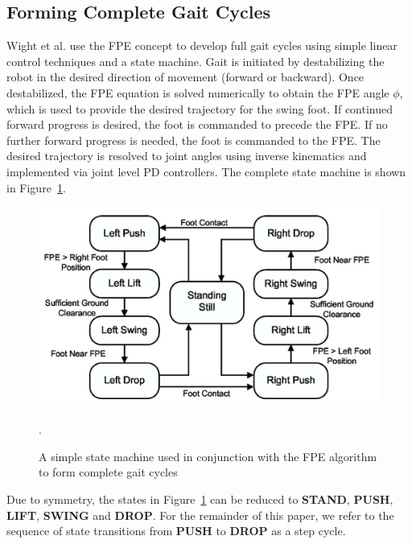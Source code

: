 \subsection{Forming Complete Gait Cycles} %
\label{sub:gait_cycles}
Wight et al. \cite{Wight:2008ii} use the FPE concept to develop full gait cycles using simple linear control techniques and a state machine. Gait is initiated by destabilizing the robot in the desired direction of movement (forward or backward). Once destabilized, the FPE equation is solved numerically to obtain the FPE angle $\phi$, which is used to provide the desired trajectory for the swing foot.  If continued forward progress is desired, the foot is commanded to precede the FPE. If no further forward progress is needed, the foot is commanded to the FPE. The desired trajectory is resolved to joint angles using inverse kinematics and implemented via joint level PD controllers. The complete state machine is shown in Figure~\ref{fig:statemachine}.

\begin{figure}[!h]
	\centering
    \includegraphics[scale=0.22]{fig/ch4/fpestatemachine.png}
  	\caption{A simple state machine used in conjunction with the FPE algorithm to form complete gait cycles}.
	\label{fig:statemachine}
\end{figure}

Due to symmetry, the states in Figure~\ref{fig:statemachine} can be reduced to \textbf{STAND}, \textbf{PUSH}, \textbf{LIFT}, \textbf{SWING} and \textbf{DROP}. For the remainder of this paper, we refer to the sequence of state transitions from \textbf{PUSH} to \textbf{DROP} as a step cycle.



